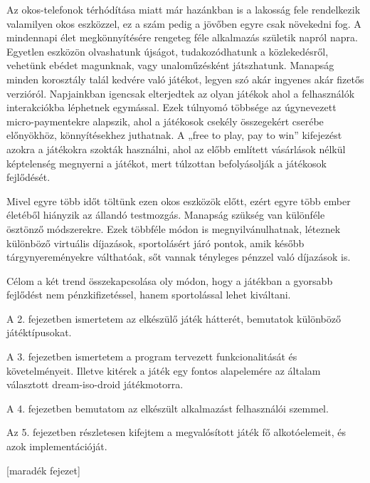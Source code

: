 Az okos-telefonok térhódítása miatt már hazánkban is a lakosság fele rendelkezik valamilyen okos eszközzel, ez a szám pedig a jövőben egyre csak növekedni fog. A mindennapi élet megkönnyítésére rengeteg féle alkalmazás születik napról napra. Egyetlen eszközön olvashatunk újságot, tudakozódhatunk a közlekedésről, vehetünk ebédet magunknak, vagy unaloműzésként játszhatunk. Manapság minden korosztály talál kedvére való játékot, legyen szó akár ingyenes akár fizetős verzióról. Napjainkban igencsak elterjedtek az olyan játékok ahol a felhasználók interakciókba léphetnek egymással. Ezek túlnyomó többsége az úgynevezett micro-paymentekre alapszik, ahol a játékosok csekély összegekért cserébe előnyökhöz, könnyítésekhez juthatnak. A „free to play, pay to win” kifejezést azokra a játékokra szokták használni, ahol az előbb említett vásárlások nélkül képtelenség megnyerni a játékot, mert túlzottan befolyásolják a játékosok fejlődését.

Mivel egyre több időt töltünk ezen okos eszközök előtt, ezért egyre több ember életéből hiányzik az állandó testmozgás. Manapság szükség van különféle ösztönző módszerekre. Ezek többféle módon is megnyilvánulhatnak, léteznek különböző virtuális díjazások, sportolásért járó pontok, amik később tárgynyereményekre válthatóak, sőt vannak tényleges pénzzel való díjazások is.

Célom a két trend összekapcsolása oly módon, hogy a játékban a gyorsabb fejlődést nem pénzkifizetéssel, hanem sportolással lehet kiváltani.

A 2. fejezetben ismertetem az elkészülő játék hátterét, bemutatok különböző játéktípusokat.

A 3. fejezetben ismertetem a program tervezett funkcionalitását és követelményeit. Illetve kitérek a játék egy fontos alapelemére az általam választott dream-iso-droid játékmotorra.

A 4. fejezetben bemutatom az elkészült alkalmazást felhasználói szemmel.

Az 5. fejezetben részletesen kifejtem a megvalósított játék fő alkotóelemeit, és azok implementációját.

[maradék fejezet]